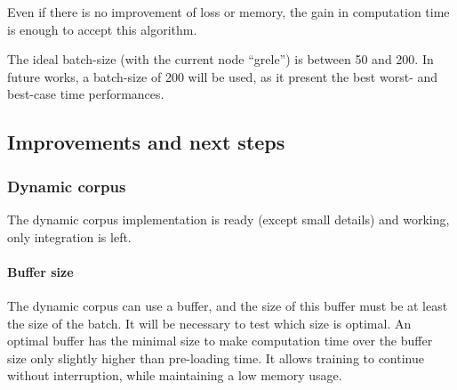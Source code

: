 Even if there is no improvement of loss or memory, the gain in
computation time is enough to accept this algorithm.

The ideal batch-size (with the current node ``grele'') is between 50 and
200. In future works, a batch-size of 200 will be used, as it present
the best worst- and best-case time performances.

\subsection{Improvements and next
steps}

\subsubsection{Dynamic corpus}

The dynamic corpus implementation is ready (except small details) and
working, only integration is left.

\paragraph{Buffer size}

The dynamic corpus can use a buffer, and the size of this buffer must be
at least the size of the batch. It will be necessary to test which size
is optimal. An optimal buffer has the minimal size to make computation
time over the buffer size only slightly higher than pre-loading time. It
allows training to continue without interruption, while maintaining a
low memory usage.
